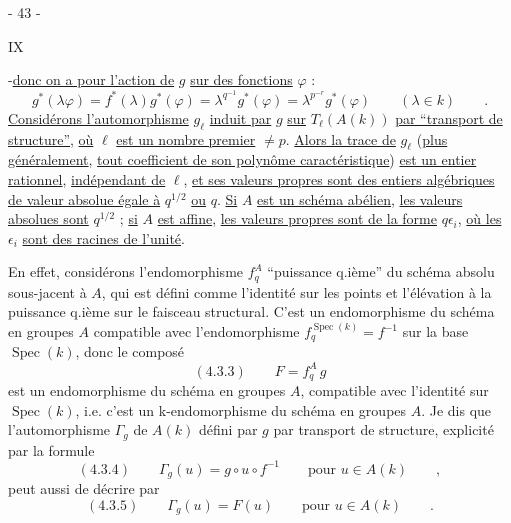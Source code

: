 \begin{center}- 43 -\end{center}\hfill IX

-\uline{donc on a pour l'action de} $g$ \uline{sur des fonctions} $\varphi$ :
\[
 g^*(\lambda\varphi)=f^*(\lambda)g^*(\varphi)
 =\lambda^{q^{-1}}g^*(\varphi)=\lambda^{p^{-r}}g^*(\varphi)
 \qquad(\lambda\in k)\qquad.
\]
\uline{Considérons l'automorphisme} $g_\ell$ \uline{induit par} $g$ \uline{sur}
$T_\ell(A(k))$ \uline{par ``transport de structure''}, \uline{où} $\ell$
\uline{est un nombre premier} $\neq p$. \uline{Alors la trace de} $g_\ell$
(\uline{plus généralement}, \uline{tout coefficient de son polynôme caractéristique})
\uline{est un entier rationnel}, \uline{indépendant de} $\ell$, \uline{et ses valeurs propres
sont des entiers algébriques de valeur absolue égale à} $q^{1/2}$ \uline{ou} $q$.
\uline{Si} $A$ \uline{est un schéma abélien}, \uline{les valeurs absolues sont} $q^{1/2}$ ;
\uline{si} $A$ \uline{est affine}, \uline{les valeurs propres sont de la forme} $q\epsilon_i$,
\uline{où les} $\epsilon_i$ \uline{sont des racines de l'unité}.

En effet, considérons l'endomorphisme $f_q^A$ ``puissance q.ième''
du schéma absolu sous-jacent à $A$, qui est défini comme l'identité
sur les points et l'élévation à la puissance q.ième sur le faisceau
structural. C'est un endomorphisme du schéma en groupes $A$ compatible
avec l'endomorphisme $f_q^{\operatorname{Spec}(k)}=f^{-1}$ sur la base $\operatorname{Spec}(k)$, donc le
composé
\[
 (4.3.3)\qquad F=f_q^A\,g
\]
est un endomorphisme du schéma en groupes $A$, compatible avec l'identité
sur $\operatorname{Spec}(k)$, i.e. c'est un k-endomorphisme du schéma en groupes $A$.
Je dis que l'automorphisme $\Gamma_g$ de $A(k)$ défini par $g$ par transport de
structure, explicité par la formule
\[
 (4.3.4)\qquad \Gamma_g(u)=g\circ u\circ f^{-1}\qquad\text{pour }u\in A(k)\qquad,
\]
peut aussi de décrire par
\[
 (4.3.5)\qquad\Gamma_g(u)=F(u)\qquad\text{pour }u\in A(k)\qquad.
\]
